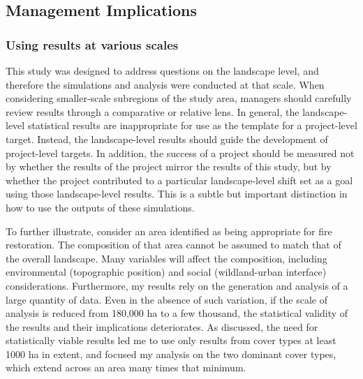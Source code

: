 





\subsection*{Management Implications}

\subsubsection*{Using results at various scales}
This study was designed to address questions on the landscape level, and therefore the simulations and analysis were conducted at that scale. When considering smaller-scale subregions of the study area, managers should carefully review results through a comparative or relative lens. In general, the landscape-level statistical results are inappropriate for use as the template for a project-level target. Instead, the landscape-level results should guide the development of project-level targets. In addition, the success of a project should be measured not by whether the results of the project mirror the results of this study, but by whether the project contributed to a particular landscape-level shift set as a goal using those landscape-level results. This is a subtle but important distinction in how to use the outputs of these simulations. 

To further illustrate, consider an area identified as being appropriate for fire restoration. The composition of that area cannot be assumed to match that of the overall landscape. Many variables will affect the composition, including environmental (topographic position) and social (wildland-urban interface) considerations. Furthermore, my results rely on the generation and analysis of a large quantity of data. Even in the absence of such variation, if the scale of analysis is reduced from 180,000 ha to a few thousand, the statistical validity of the results and their implications deteriorates. As discussed, the need for statistically viable results led me to use only results from cover types at least 1000 ha in extent, and focused my analysis on the two dominant cover types, which extend across an area many times that minimum.

